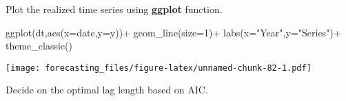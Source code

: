 \documentclass[
  oneside]{book}
\newenvironment{Shaded}{\begin{snugshade}}{\end{snugshade}}
\newcommand{\AttributeTok}[1]{\textcolor[rgb]{0.77,0.63,0.00}{#1}}
\newcommand{\DecValTok}[1]{\textcolor[rgb]{0.00,0.00,0.81}{#1}}
\newcommand{\FunctionTok}[1]{\textcolor[rgb]{0.00,0.00,0.00}{#1}}
\newcommand{\NormalTok}[1]{#1}
\newcommand{\SpecialCharTok}[1]{\textcolor[rgb]{0.00,0.00,0.00}{#1}}
\newcommand{\StringTok}[1]{\textcolor[rgb]{0.31,0.60,0.02}{#1}}
\begin{document}
Plot the realized time series using \textbf{ggplot} function.

\begin{Shaded}
\begin{Highlighting}[]
\FunctionTok{ggplot}\NormalTok{(dt,}\FunctionTok{aes}\NormalTok{(}\AttributeTok{x=}\NormalTok{date,}\AttributeTok{y=}\NormalTok{y))}\SpecialCharTok{+}
  \FunctionTok{geom\_line}\NormalTok{(}\AttributeTok{size=}\DecValTok{1}\NormalTok{)}\SpecialCharTok{+}
  \FunctionTok{labs}\NormalTok{(}\AttributeTok{x=}\StringTok{"Year"}\NormalTok{,}\AttributeTok{y=}\StringTok{"Series"}\NormalTok{)}\SpecialCharTok{+}
  \FunctionTok{theme\_classic}\NormalTok{()}
\end{Highlighting}
\end{Shaded}

\texttt{[image: forecasting\_files/figure-latex/unnamed-chunk-82-1.pdf]}

Decide on the optimal lag length based on AIC.
\end{document}

